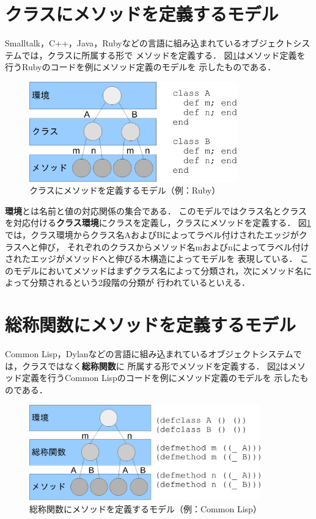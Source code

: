 \documentclass[a4paper,11pt,dvipdfmx]{jreport}
\begin{document}
\section{クラスにメソッドを定義するモデル}

Smalltalk，C++，Java，Rubyなどの言語に組み込まれているオブジェクトシステムでは，クラスに所属する形で
メソッドを定義する．
図\ref{figure:class-model}はメソッド定義を行うRubyのコードを例にメソッド定義のモデルを
示したものである．

\begin{figure}[htbp]
	\centering
	\includegraphics[width=9cm]{fig/trees_class-crop.pdf}
	\caption{クラスにメソッドを定義するモデル（例：Ruby）}
	\label{figure:class-model}
\end{figure}

\textbf{環境}とは名前と値の対応関係の集合である．
このモデルではクラス名とクラスを対応付ける\textbf{クラス環境}にクラスを定義し，クラスにメソッドを定義する．
図\ref{figure:class-model}では，クラス環境からクラス名AおよびBによってラベル付けされたエッジがクラスへと伸び，
それぞれのクラスからメソッド名mおよびnによってラベル付けされたエッジがメソッドへと伸びる木構造によってモデルを
表現している．
このモデルにおいてメソッドはまずクラス名によって分類され，次にメソッド名によって分類されるという2段階の分類が
行われているといえる．

\section{総称関数にメソッドを定義するモデル}

Common Lisp，Dylanなどの言語に組み込まれているオブジェクトシステムでは，クラスではなく\textbf{総称関数}に
所属する形でメソッドを定義する．
図\ref{figure:gf-model}はメソッド定義を行うCommon Lispのコードを例にメソッド定義のモデルを
示したものである．

\begin{figure}[htbp]
	\centering
	\includegraphics[width=10cm]{fig/trees_gf-crop.pdf}
	\caption{総称関数にメソッドを定義するモデル（例：Common Lisp）}
	\label{figure:gf-model}
\end{figure}
\end{document}
